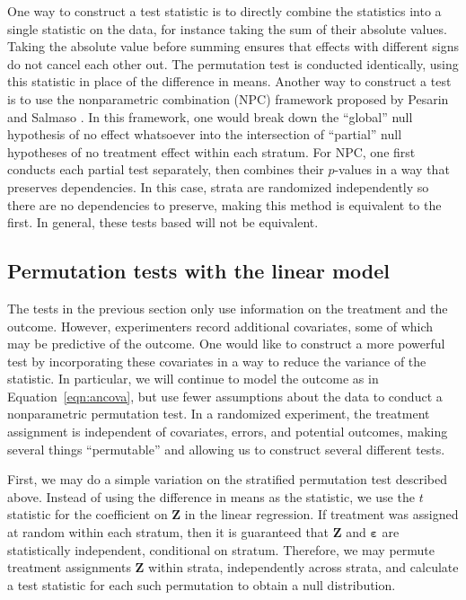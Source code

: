 \documentclass[12pt]{article}
\begin{document}
One way to construct a test statistic is to directly combine the statistics into a single statistic on the data, for instance taking the sum of their absolute values.
Taking the absolute value before summing ensures that effects with different signs do not cancel each other out.
The permutation test is conducted identically, using this statistic in place of the difference in means.
Another way to construct a test is to use the nonparametric combination (NPC) framework proposed by Pesarin and Salmaso \cite{pesarin_permutation_2010}.
In this framework, one would break down the ``global'' null hypothesis of no effect whatsoever into the intersection of ``partial'' null hypotheses of no treatment effect within each stratum.
For NPC, one first conducts each partial test separately, then combines their $p$-values in a way that preserves dependencies.
In this case, strata are randomized independently so there are no dependencies to preserve, making this method is equivalent to the first.
In general, these tests based will not be equivalent.

\subsection{Permutation tests with the linear model}
The tests in the previous section only use information on the treatment and the outcome.
However, experimenters record additional covariates, some of which may be predictive of the outcome.
One would like to construct a more powerful test by incorporating these covariates in a way to reduce the variance of the statistic.
In particular, we will continue to model the outcome as in Equation~\ref{eqn:ancova}, but use fewer assumptions about the data to conduct a nonparametric permutation test.
In a randomized experiment, the treatment assignment is independent of covariates, errors, and potential outcomes,
making several things ``permutable'' and allowing us to construct several different tests.

First, we may do a simple variation on the stratified permutation test described above.
Instead of using the difference in means as the statistic, we use the $t$ statistic for the coefficient on $\mathbf{Z}$ in the linear regression.
If treatment was assigned at random within each stratum, then it is guaranteed that $\mathbf{Z}$ and $\mathbf{\varepsilon}$ are statistically independent, conditional on stratum.
Therefore, we may permute treatment assignments $\mathbf{Z}$ within strata, independently across strata, and calculate a test statistic for each such permutation to obtain a null distribution.
\end{document}
